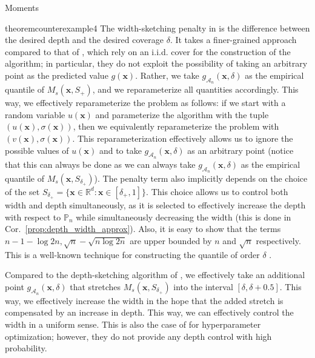 \begin{assumptioni}[i.i.d data]
\begin{assumptioni}
\begin{assumptioni}{Moments}
\begin{restatable}{theorem}{counterexample4}
The width-sketching penalty in  is the difference between the desired depth and the desired coverage $\delta$. It takes a finer-grained approach compared to that of \cite{angelopoulos2024conformal;bates2021distributionfree}, which rely on an i.i.d. cover for the construction of the algorithm; in particular, they do not exploit the possibility of taking an arbitrary point as the predicted value $g(\bm{x})$. Rather, we take $g_{\mathcal{A}_n}(\bm{x},\delta)$ as the empirical quantile of $M_s(\bm{x},S_+)$, and we reparameterize all quantities accordingly. This way, we effectively reparameterize the problem as follows: if we start with a random variable $u(\bm{x})$ and parameterize the algorithm with the tuple $(u(\bm{x}),\sigma(\bm{x}))$, then we equivalently reparameterize the problem with $(v(\bm{x}),\sigma(\bm{x}))$. 
This reparameterization effectively allows us to ignore the possible values of $u(\bm{x})$ and to take $g_{\mathcal{A}_n}(\bm{x},\delta)$ as an arbitrary point (notice that this can always be done as we can always take  $g_{\mathcal{A}_n}(\bm{x},\delta)$ as the empirical quantile of $M_s(\bm{x},S_{\delta_+})$). 
The penalty term also implicitly depends on the choice of the set $S_{\delta_+} = \{\bm{x} \in \mathbb{R}^d : \bm{x} \in [\delta_+,1]\}$. This choice allows us to control both width and depth simultaneously, as it is selected to effectively increase the depth with respect to $\mathbb{P}_n$ while simultaneously decreasing the width (this is done in Cor.~\ref{prop:depth_width_approx}). 
Also, it is easy to show that the terms $n - 1 - \log 2n, \sqrt{n} - \sqrt{n \log 2n}$ are upper bounded by $n$ and $\sqrt{n}$ respectively. This is a well-known technique for constructing the quantile of order $\delta$ \cite[see, e.g.,][]{wilks1941determination}.

Compared to the depth-sketching algorithm of \cite{angelopoulos2024conformal}, we effectively take an additional point $g_{\mathcal{A}_n}(\bm{x},\delta)$ that stretches $M_s(\bm{x},S_{\delta_+})$ into the interval $[\delta,\delta+0.5]$. This way, we effectively increase the width in the hope that the added stretch is compensated by an increase in depth. This way, we can effectively control the width in a uniform sense. This is also the case of \cite{farzaneh2024quantile} for hyperparameter optimization; however, they do not provide any depth control with high probability. 



\end{restatable}
\end{assumptioni}
\end{assumptioni}
\end{assumptioni}
